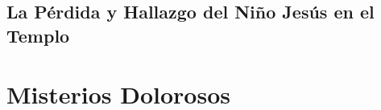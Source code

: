 \documentclass[a4paper,11pt]{article}
\begin{document}
      
      \medskip
      
      
      \medskip

      
      \medskip
      
      
      \medskip
      
      
      \medskip
      
      
      \medskip
      
      
      \medskip
            
    \subsection*{\hfil La Pérdida y Hallazgo del Niño Jesús en el Templo \hfil}
      
      
      \medskip
      
      
      \medskip
      
      
      \medskip
      
      
      \medskip
      
      
      \medskip

      
      \medskip
      
      
      \medskip
      
      
      \medskip
      
      
      \medskip     
      
      
      \medskip
            
    \newpage
        
  \section*{\hfil Misterios Dolorosos \hfil}
\end{document}
